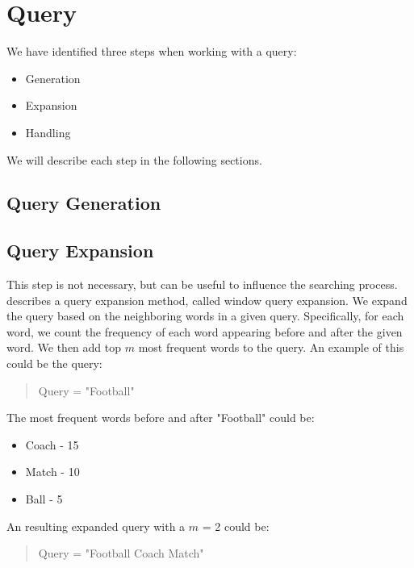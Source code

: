 \section{Query}
We have identified three steps when working with a query:
\begin{itemize}
	\item Generation
	\item Expansion
	\item Handling
\end{itemize}

We will describe each step in the following sections.

\subsection{Query Generation}


\subsection{Query Expansion}
This step is not necessary, but can be useful to influence the searching process. 
\citet{yang2009topic} describes a query expansion method, called window query expansion.
We expand the query based on the neighboring words in a given query.
Specifically, for each word, we count the frequency of each word appearing before and after the given word.
We then add top $m$ most frequent words to the query.
An example of this could be the query: 
\begin{quote}
	Query = "Football"
\end{quote}
The most frequent words before and after "Football" could be:
\begin{itemize}
	\item Coach - 15
	\item Match - 10
	\item Ball - 5
\end{itemize}
An resulting expanded query with a $m$ = 2 could be:
\begin{quote}
	Query = "Football Coach Match"
\end{quote}



